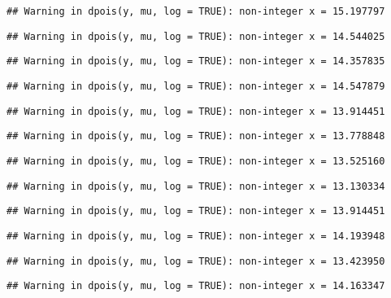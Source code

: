 \documentclass[
]{article}
\begin{document}
\begin{verbatim}
## Warning in dpois(y, mu, log = TRUE): non-integer x = 15.197797
\end{verbatim}

\begin{verbatim}
## Warning in dpois(y, mu, log = TRUE): non-integer x = 14.544025
\end{verbatim}

\begin{verbatim}
## Warning in dpois(y, mu, log = TRUE): non-integer x = 14.357835
\end{verbatim}

\begin{verbatim}
## Warning in dpois(y, mu, log = TRUE): non-integer x = 14.547879
\end{verbatim}

\begin{verbatim}
## Warning in dpois(y, mu, log = TRUE): non-integer x = 13.914451
\end{verbatim}

\begin{verbatim}
## Warning in dpois(y, mu, log = TRUE): non-integer x = 13.778848
\end{verbatim}

\begin{verbatim}
## Warning in dpois(y, mu, log = TRUE): non-integer x = 13.525160
\end{verbatim}

\begin{verbatim}
## Warning in dpois(y, mu, log = TRUE): non-integer x = 13.130334
\end{verbatim}

\begin{verbatim}
## Warning in dpois(y, mu, log = TRUE): non-integer x = 13.914451
\end{verbatim}

\begin{verbatim}
## Warning in dpois(y, mu, log = TRUE): non-integer x = 14.193948
\end{verbatim}

\begin{verbatim}
## Warning in dpois(y, mu, log = TRUE): non-integer x = 13.423950
\end{verbatim}

\begin{verbatim}
## Warning in dpois(y, mu, log = TRUE): non-integer x = 14.163347
\end{verbatim}
\end{document}
